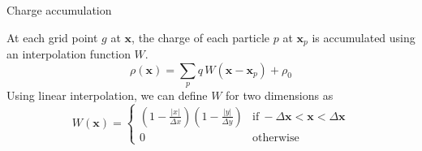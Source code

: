 \documentclass{beamer}
\newcommand*\V[1]{\bm{#1}}
\newcommand{\x}{\V{x}}
\begin{document}
\begin{frame}{Charge accumulation}{}

At each grid point $g$ at $\x$, the charge of each particle $p$ at $\x_p$ is 
accumulated using an interpolation function $W$.
\begin{equation}%
\rho(\x) = \sum_p q\,W(\x - \x_p) + \rho_0
\label{eq:charge-accumulation}
\end{equation}%
Using linear interpolation, we can define $W$ for two dimensions as
\begin{equation}%
W(\x) =
\begin{cases}
			\displaystyle\left(1 - \frac{|x|}{\Delta x}\right)
				\left(1 - \frac{|y|}{\Delta y}\right) & \text{if}\ -\Delta\x < \x < 
				\Delta \x\\
			0 & \text{otherwise}
\end{cases}
\end{equation}%
\end{frame}
\end{document}

